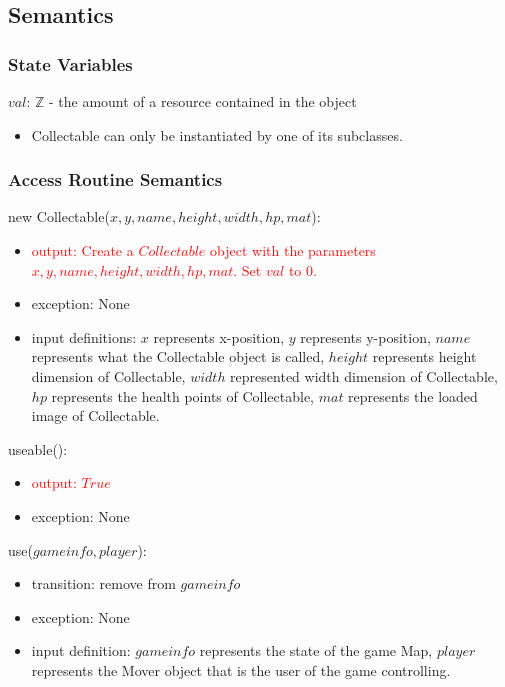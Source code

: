 \documentclass[12pt]{article}
\newcommand{\m}[1]{\mbox{#1}}
\begin{document}
\subsection*{Semantics}

\subsubsection*{State Variables}

$val$: $\mathbb{Z}$ - the amount of a resource contained in the object

\begin{itemize}
    \item Collectable can only be instantiated by one of its subclasses.
\end{itemize}

\subsubsection*{Access Routine Semantics}

new Collectable($x, y, name, height, width, hp, mat$):
\begin{itemize}
    \item \textcolor{red}{output: Create a $Collectable$ object with the parameters $x, y, name, height, width, hp, mat$. Set $val$ to 0.}
    \item exception: None
    \item input definitions: $x$ represents x-position, $y$ represents y-position, $name$ represents what the Collectable object is called, $height$ represents height dimension of Collectable, $width$ represented width dimension of Collectable, $hp$ represents the health points of Collectable, $mat$ represents the loaded image of Collectable.
\end{itemize}

\noindent useable():
\begin{itemize}
    \item \textcolor{red}{output: $True$}
    \item exception: None
\end{itemize}

\noindent use($gameinfo, player$):
\begin{itemize}
    \item transition: remove from $gameinfo$
    \item exception: None
    \item input definition: $gameinfo$ represents the state of the game Map, $player$ represents the Mover object that is the user of the game controlling.
\end{itemize}
\end{document}
